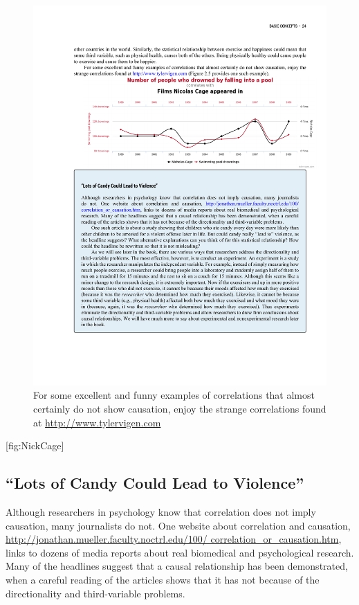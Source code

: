 \documentclass[]{book}
\theoremstyle{definition}
\theoremstyle{definition}
\theoremstyle{remark}
\begin{document}
\begin{figure}[htbp]
\centering
\includegraphics{figures/C2F6NickCage.pdf}
\caption{For some excellent and funny examples of correlations that
almost certainly do not show causation, enjoy the strange correlations
found at \url{http://www.tylervigen.com}}
\end{figure}

{[}fig:NickCage{]}

\subsection{\texorpdfstring{``Lots of Candy Could Lead to
Violence''}{Lots of Candy Could Lead to Violence}}\label{lots-of-candy-could-lead-to-violence}

Although researchers in psychology know that correlation does not imply
causation, many journalists do not. One website about correlation and
causation,
\href{http://jonathan.mueller.faculty.noctrl.edu/100/\%20correlation_or_causation.htm}{http://jonathan.mueller.faculty.noctrl.edu/100/
correlation\_or\_causation.htm}, links to dozens of media reports about
real biomedical and psychological research. Many of the headlines
suggest that a causal relationship has been demonstrated, when a careful
reading of the articles shows that it has not because of the
directionality and third-variable problems.
\end{document}

